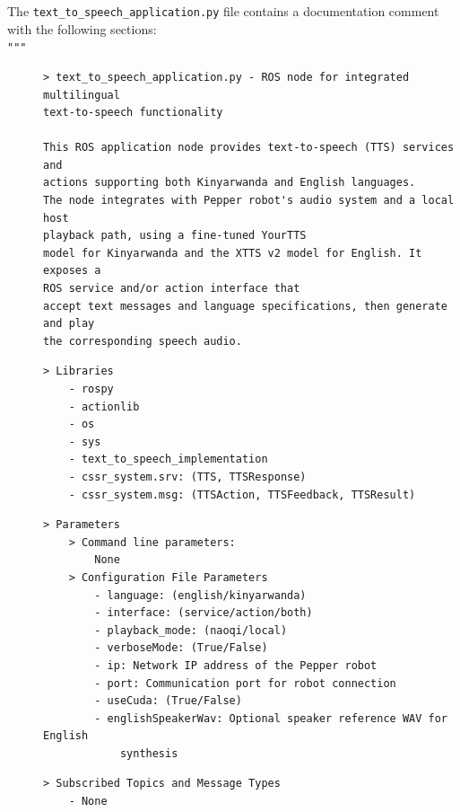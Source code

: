 \documentclass{CSSRforAfrica}
\newcommand{\checkboxChecked}{\fbox{\ding{51}}} %
\begin{document}
\noindent The {\small \verb+text_to_speech_application.py+} file contains a documentation comment with the following sections:\\

\noindent \verb+"""+

\begin{description}

\item[\checkboxChecked] 
{\small 
\begin{verbatim}
> text_to_speech_application.py - ROS node for integrated multilingual
text-to-speech functionality

This ROS application node provides text-to-speech (TTS) services and
actions supporting both Kinyarwanda and English languages.
The node integrates with Pepper robot's audio system and a local host
playback path, using a fine-tuned YourTTS
model for Kinyarwanda and the XTTS v2 model for English. It exposes a
ROS service and/or action interface that
accept text messages and language specifications, then generate and play
the corresponding speech audio.
\end{verbatim}}

\item[\checkboxChecked] 
{\small 
\begin{verbatim}
> Libraries
    - rospy
    - actionlib
    - os
    - sys
    - text_to_speech_implementation
    - cssr_system.srv: (TTS, TTSResponse)
    - cssr_system.msg: (TTSAction, TTSFeedback, TTSResult)
\end{verbatim}}

\item[\checkboxChecked] 
{\small 
\begin{verbatim}
> Parameters
    > Command line parameters:
        None
    > Configuration File Parameters
        - language: (english/kinyarwanda)
        - interface: (service/action/both)
        - playback_mode: (naoqi/local)
        - verboseMode: (True/False)
        - ip: Network IP address of the Pepper robot
        - port: Communication port for robot connection
        - useCuda: (True/False)
        - englishSpeakerWav: Optional speaker reference WAV for English
            synthesis
\end{verbatim}}

\item[\checkboxChecked] 
{\small 
\begin{verbatim}
> Subscribed Topics and Message Types
    - None
\end{verbatim}}


\end{description}
\end{document}

